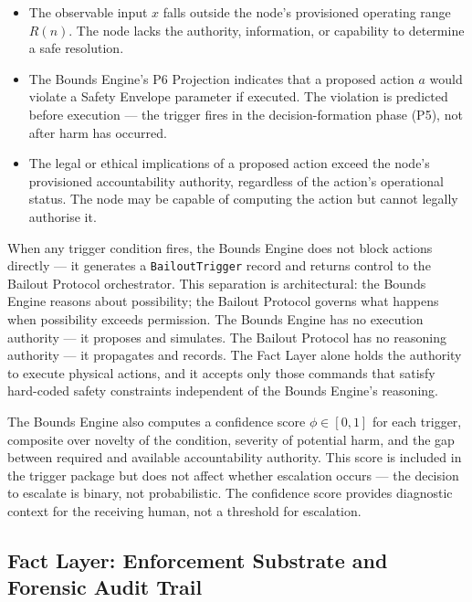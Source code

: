 \begin{itemize}
  \item[\textbf{TC1 — Capability Boundary.}] The observable input $x$ falls outside the node's provisioned operating range $R(n)$. The node lacks the authority, information, or capability to determine a safe resolution.
  \item[\textbf{TC2 — Safety Envelope Predicted Violation.}] The Bounds Engine's P6 Projection indicates that a proposed action $a$ would violate a Safety Envelope parameter if executed. The violation is predicted before execution — the trigger fires in the decision-formation phase (P5), not after harm has occurred.
  \item[\textbf{TC3 — Accountability Boundary.}] The legal or ethical implications of a proposed action exceed the node's provisioned accountability authority, regardless of the action's operational status. The node may be capable of computing the action but cannot legally authorise it.
\end{itemize}

When any trigger condition fires, the Bounds Engine does not block actions directly — it generates a \texttt{BailoutTrigger} record and returns control to the Bailout Protocol orchestrator. This separation is architectural: the Bounds Engine reasons about possibility; the Bailout Protocol governs what happens when possibility exceeds permission. The Bounds Engine has no execution authority — it proposes and simulates. The Bailout Protocol has no reasoning authority — it propagates and records. The Fact Layer alone holds the authority to execute physical actions, and it accepts only those commands that satisfy hard-coded safety constraints independent of the Bounds Engine's reasoning.

The Bounds Engine also computes a confidence score $\phi \in [0,1]$ for each trigger, composite over novelty of the condition, severity of potential harm, and the gap between required and available accountability authority. This score is included in the trigger package but does not affect whether escalation occurs — the decision to escalate is binary, not probabilistic. The confidence score provides diagnostic context for the receiving human, not a threshold for escalation.

\subsection{Fact Layer: Enforcement Substrate and Forensic Audit Trail}
\label{sec:fact-layer-enforcement}

